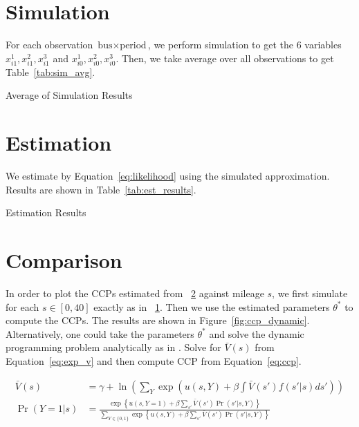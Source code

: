 \documentclass[12pt]{article}[margin=1in]
\begin{document}
\section{Simulation}\label{sec:simulation}
For each observation $\text{bus} \times \text{period}$, we perform simulation
to get the 6 variables $x_{i1}^1,x_{i1}^2,x_{i1}^3$ and
$x_{i0}^1,x_{i0}^2,x_{i0}^3$. Then, we take average over all observations to
get Table~\ref{tab:sim_avg}.

\begin{table}[!htbp]
    \centering
    
    \caption{Average of Simulation Results}
    \label{tab:sim_avg}
\end{table}

\section{Estimation}\label{sec:estimation}
We estimate by Equation~\ref{eq:likelihood} using the simulated approximation.
Results are shown in Table~\ref{tab:est_results}.
\begin{table}[!htbp]
    \centering
    
    \caption{Estimation Results}
    \label{tab:est_results}
\end{table}

\section{Comparison}

In order to plot the CCPs estimated from ~\ref{sec:estimation} against mileage
$s$, we first simulate for each $s\in [0,40]$ exactly as in
~\ref{sec:simulation}. Then we use the estimated parameters $\theta^*$ to
compute the CCPs. The results are shown in Figure~\ref{fig:ccp_dynamic}.
Alternatively, one could take the parameters $\theta^*$ and solve the dynamic
programming problem analytically as in \citet{rust1987optimal}. Solve for
$\bar{V}(s)$ from Equation~\ref{eq:exp_v} and then compute CCP from
Equation~\ref{eq:ccp}.

\begin{align}
    \bar{V}(s) & =\gamma+\ln\left(\sum_{Y} \exp\left(u(s,Y)+\beta\int \bar{V}(s') f(s'|s) ds'\right)\right)                                        \label{eq:exp_v}                                     \\
    \Pr(Y=1|s) & =\frac{\exp\left\{ u(s,Y=1) + \beta \sum_{s'}\bar{V}(s') \Pr(s'|s,Y)\right\}}{\sum_{Y \in \{0,1\}} \exp\left\{ u(s,Y) + \beta \sum_{s'}\bar{V}(s') \Pr(s'|s,Y)\right\}} \label{eq:ccp}
\end{align}
\end{document}

